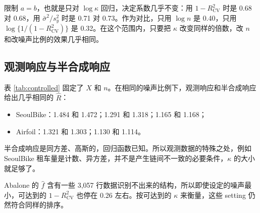 \documentclass[11pt]{article}
\newcommand{\Rhat}{\hat R}
\begin{document}
限制 $a=b$，也就是只对 $\log\kappa$ 回归，决定系数几乎不变：用 $1-R^2_{\mathrm{CV}}$ 时是 0.68 对 0.68，用 $\bar\sigma^2/s_y^2$ 时是 0.71 对 0.73。作为对比，只用 $\log n$ 是 0.40，只用 $\log\{1/(1-R^2_{\mathrm{CV}})\}$ 是 0.32。在这个范围内，只要把 $\kappa$ 改变同样的倍数，改 $n$ 和改噪声比例的效果几乎相同。

\subsection{观测响应与半合成响应}
表 \ref{tab:controlled} 固定了 $X$ 和 $n$。在相同的噪声比例下，观测响应和半合成响应给出几乎相同的 $\Rhat$：
\begin{itemize}
\item SeoulBike：1.484 和 1.472；1.291 和 1.318；1.165 和 1.168；
\item Airfoil：1.321 和 1.303；1.130 和 1.114。
\end{itemize}
半合成响应是同方差、高斯的，回归函数已知。所以观测数据的特殊之处，例如 SeoulBike 租车量是计数、异方差，并不是产生链间不一致的必要条件，$\kappa$ 的大小就足够了。

Abalone 的 $\hat f$ 含有一些 3,057 行数据识别不出来的结构，所以即使设定的噪声最小，可达到的 $1-R^2_{\mathrm{CV}}$ 也停在 0.26 左右。按可达到的 $\kappa$ 来衡量，这些 setting 仍然符合同样的排序。
\end{document}
